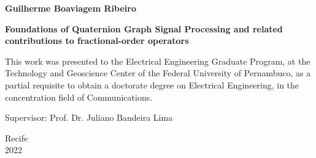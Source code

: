 \begin{center}
    \begin{spacing}{1.7}
        \textbf{Guilherme Boaviagem Ribeiro}\\
    \end{spacing}
\end{center}

\vspace{3cm}

\begin{center}
    \begin{spacing}{1.6}
        \Large
        \textbf{Foundations of Quaternion Graph Signal Processing and related contributions to fractional-order operators}
    \end{spacing}
\end{center}

\vspace{1cm}

\begin{flushright}
\begin{minipage}{0.5\linewidth}
This work was presented to the Electrical Engineering Graduate Program, at the Technology and Geoscience Center of the Federal University of Pernambuco, as a partial requisite to obtain a doctorate degree on Electrical Engineering, in the concentration field of Communications.
\end{minipage}
\end{flushright}


\vfill

\begin{center}
\begin{spacing}{1.5}
{Supervisor: Prof. Dr. Juliano Bandeira Lima}\\
\end{spacing}
\end{center}

\vfill

\begin{center}
Recife \\
2022
\end{center}
